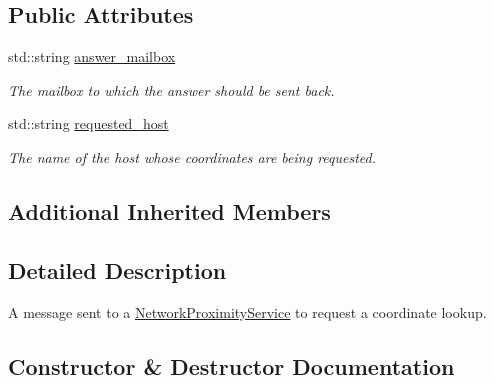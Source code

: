 \subsection*{Public Attributes}
\begin{DoxyCompactItemize}
\item 
\mbox{\label{classwrench_1_1_coordinate_lookup_request_message_a0091dffe98f45b5a4ec3334fcba93589}} 
std\+::string \hyperlink{classwrench_1_1_coordinate_lookup_request_message_a0091dffe98f45b5a4ec3334fcba93589}{answer\+\_\+mailbox}
\begin{DoxyCompactList}\small\item\em The mailbox to which the answer should be sent back. \end{DoxyCompactList}\item 
\mbox{\label{classwrench_1_1_coordinate_lookup_request_message_a140e42fa600294b3e3708cd98b0ef68d}} 
std\+::string \hyperlink{classwrench_1_1_coordinate_lookup_request_message_a140e42fa600294b3e3708cd98b0ef68d}{requested\+\_\+host}
\begin{DoxyCompactList}\small\item\em The name of the host whose coordinates are being requested. \end{DoxyCompactList}\end{DoxyCompactItemize}
\subsection*{Additional Inherited Members}


\subsection{Detailed Description}
A message sent to a \hyperlink{classwrench_1_1_network_proximity_service}{Network\+Proximity\+Service} to request a coordinate lookup. 

\subsection{Constructor \& Destructor Documentation}
\mbox{\label{classwrench_1_1_coordinate_lookup_request_message_add73a19bf3264991e80ac729e53386a5}} 
